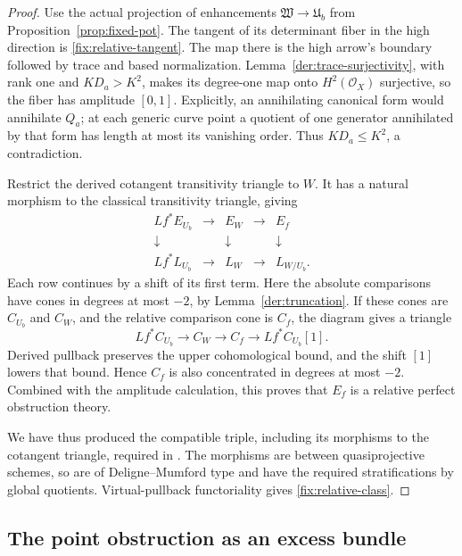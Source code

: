 \begin{proof}
Use the actual projection of enhancements
\(\mathfrak W\to\mathfrak U_b\) from
Proposition~\ref{prop:fixed-pot}.  The tangent of its determinant
fiber in the high direction is \eqref{fix:relative-tangent}.
The map there is the high arrow's boundary followed by trace
and based normalization.  Lemma~\ref{der:trace-surjectivity},
with rank one and \(KD_a>K^2\), makes its degree-one map onto
\(H^2(\mathcal O_X)\) surjective, so the fiber has amplitude
\([0,1]\).  Explicitly, an annihilating canonical form would
annihilate \(Q_a\); at each generic curve point a quotient of
one generator annihilated by that form has length at most its
vanishing order.  Thus \(KD_a\le K^2\), a contradiction.

Restrict the derived cotangent transitivity triangle to \(W\).
It has a natural morphism to the classical transitivity
triangle, giving
\[
\begin{array}{ccccc}
 Lf^*E_{U_b}&\longrightarrow&E_W&\longrightarrow&E_f\\
 \downarrow&&\downarrow&&\downarrow\\
 Lf^*L_{U_b}&\longrightarrow&L_W&\longrightarrow&L_{W/U_b}.
\end{array}
\]
Each row continues by a shift of its first term.
Here the absolute comparisons have cones in degrees at most
\(-2\), by Lemma~\ref{der:truncation}.  If these cones are
\(C_{U_b}\) and \(C_W\), and the relative comparison cone is
\(C_f\), the diagram gives a triangle
\[
 Lf^*C_{U_b}\longrightarrow C_W\longrightarrow C_f
       \longrightarrow Lf^*C_{U_b}[1].
\]
Derived pullback preserves the upper cohomological bound, and
the shift \([1]\) lowers that bound.  Hence \(C_f\) is also
concentrated in degrees at most \(-2\).  Combined with the
amplitude calculation, this proves that \(E_f\) is a relative
perfect obstruction theory.

We have thus produced the compatible triple, including its
morphisms to the cotangent triangle, required in
\cite[Definition~4.5]{Manolache}.  The morphisms are between
quasiprojective schemes, so are of Deligne--Mumford type and
have the required stratifications by global quotients.
Virtual-pullback functoriality
\cite[Theorem~4.8 and Corollary~4.9]{Manolache} gives
\eqref{fix:relative-class}.
\end{proof}

\subsection{The point obstruction as an excess bundle}


